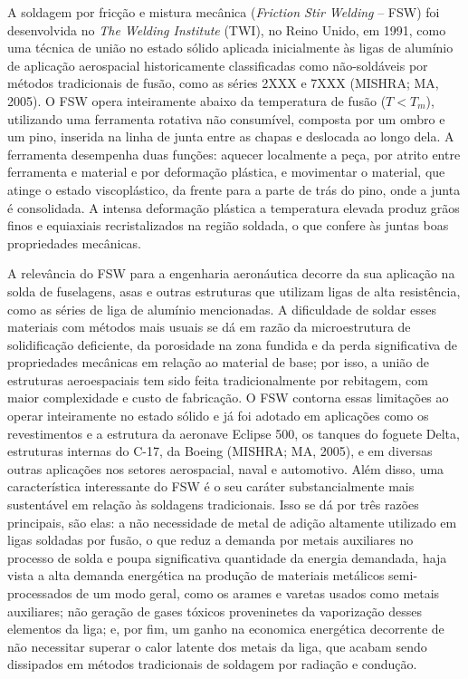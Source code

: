\documentclass[12pt,openany]{report}
\begin{document}
A soldagem por fricção e mistura mecânica (\textit{Friction Stir Welding} -- FSW) foi desenvolvida no \textit{The Welding Institute} (TWI), no Reino Unido, em 1991, como uma técnica de união no estado sólido aplicada inicialmente às ligas de alumínio de aplicação aerospacial historicamente classificadas como não-soldáveis por métodos tradicionais de fusão, como as séries 2XXX e 7XXX (MISHRA; MA, 2005). O FSW opera inteiramente abaixo da temperatura de fusão ($T < T_m$), utilizando uma ferramenta rotativa não consumível, composta por um ombro e um pino, inserida na linha de junta entre as chapas e deslocada ao longo dela. A ferramenta desempenha duas funções: aquecer localmente a peça, por atrito entre ferramenta e material e por deformação plástica, e movimentar o material, que atinge o estado viscoplástico, da frente para a parte de trás do pino, onde a junta é consolidada.  A intensa deformação plástica a temperatura elevada produz grãos finos e equiaxiais recristalizados na região soldada, o que confere às juntas boas propriedades mecânicas.


A relevância do FSW para a engenharia aeronáutica decorre da sua aplicação na solda de fuselagens, asas e outras estruturas que utilizam ligas de alta resistência, como as séries de liga de alumínio mencionadas. A dificuldade de soldar esses materiais com métodos mais usuais se dá em razão da microestrutura de solidificação deficiente, da porosidade na zona fundida e da perda significativa de propriedades mecânicas em relação ao material de base; por isso, a união de estruturas aeroespaciais tem sido feita tradicionalmente por rebitagem, com maior complexidade e custo de fabricação. O FSW contorna essas limitações ao operar inteiramente no estado sólido e já foi adotado em aplicações como os revestimentos e a estrutura da aeronave Eclipse 500, os tanques do foguete Delta, estruturas internas do C-17, da Boeing (MISHRA; MA, 2005), e em diversas outras aplicações nos setores aerospacial, naval e automotivo. Além disso, uma característica interessante do FSW é o seu caráter substancialmente mais sustentável em relação às soldagens tradicionais. Isso se dá por três razões principais, são elas: a não necessidade de metal de adição altamente utilizado em ligas soldadas por fusão, o que reduz a demanda por metais auxiliares no processo de solda e poupa significativa quantidade da energia demandada, haja vista a alta demanda energética na produção de materiais metálicos semi-processados de um modo geral, como os arames e varetas usados como metais auxiliares; não geração de gases tóxicos proveninetes da vaporização desses elementos da liga; e, por fim, um ganho na economica energética decorrente de não necessitar superar o calor latente dos metais da liga, que acabam sendo dissipados em métodos tradicionais de soldagem por radiação e condução.
\end{document}
